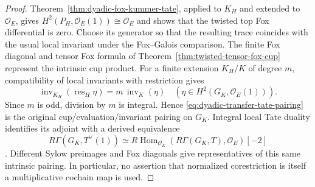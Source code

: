\begin{proof}
Theorem~\ref{thm:dyadic-fox-kummer-tate},
applied to $K_H$ and extended to $\mathcal O_E$,
gives $H^2(P_H,\mathcal O_E(1))\cong\mathcal O_E$
and shows that the twisted top Fox differential
is zero.  Choose its generator so that the
resulting trace coincides with the usual
local invariant under the Fox--Galois comparison.
The finite Fox diagonal and tensor Fox
formula of
Theorem~\ref{thm:twisted-tensor-fox-cup}
represent the intrinsic cup product.
For a finite extension $K_H/K$ of degree
$m$, compatibility of local invariants
with restriction gives
\[
\operatorname{inv}_{K_H}(\operatorname{res}_{H}\eta)
=m\,\operatorname{inv}_{K}(\eta)
\quad
(\eta\in H^2(G_K,\mathcal O_E(1))).
\]
Since $m$ is odd, division by $m$ is integral.
Hence \eqref{eq:dyadic-transfer-tate-pairing}
is the original cup/evaluation/invariant
pairing on $G_K$.
Integral local Tate duality identifies its
adjoint with a derived equivalence
\[
R\Gamma(G_K,T^\vee(1))
\simeq
R\operatorname{Hom}_{\mathcal O_E}
(R\Gamma(G_K,T),\mathcal O_E)[-2]
\]
\cite{NSW}.
Different Sylow preimages and Fox diagonals
give representatives of this same intrinsic
pairing.  In particular, no assertion that
normalized corestriction is itself a
multiplicative cochain map is used.
\end{proof}
